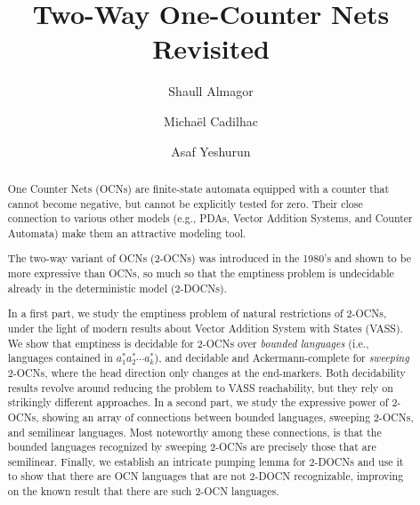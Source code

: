 \documentclass[USenglish]{lipics-v2021}
\title{Two-Way One-Counter Nets Revisited}
\author{Shaull Almagor}{Department of Computer Science, Technion, Israel \and \url{https://shaull.cswp.cs.technion.ac.il/}} {shaull@technion.ac.il}{https://orcid.org/0000-0001-9021-1175}{supported by the ISRAEL SCIENCE FOUNDATION (grant No. 989/22)}
\author{Michaël Cadilhac}{DePaul University, USA}{michael@cadilhac.name}{0000-0001-9828-9129}{}
\author{Asaf Yeshurun}{Department of Computer Science, Technion, Israel} {asafyeshurun@campus.technion.ac.il}{}{}
\begin{document}
	
	\maketitle
	
	\begin{abstract}
		One Counter Nets (OCNs) are finite-state automata equipped with a counter that
		cannot become negative, but cannot be explicitly tested for zero. Their close
		connection to various other models (e.g., PDAs, Vector Addition Systems, and
		Counter Automata) make them an attractive modeling tool.
		
		The two-way variant of OCNs (2-OCNs) was introduced in the 1980's and shown to
		be more expressive than OCNs, so much so that the emptiness problem is
		undecidable already in the deterministic model (2-DOCNs).
		
		In a first part, we study the emptiness problem of natural restrictions of
		2-OCNs, under the light of modern results about Vector Addition System with
		States (VASS).  We show that emptiness is decidable for 2-OCNs over
		\emph{bounded languages} (i.e., languages contained in
		$a_1^*a_2^*\cdots a_k^*$), and decidable and Ackermann-complete for \emph{sweeping}
		2-OCNs, where the head direction only changes at the end-markers. Both
		decidability results revolve around reducing the problem to VASS reachability,
		but they rely on strikingly different approaches.  In a second part, we study
		the expressive power of 2-OCNs, showing an array of connections between
		bounded languages, sweeping 2-OCNs, and semilinear languages.  Most noteworthy
		among these connections, is that the bounded languages recognized by sweeping
		2-OCNs are precisely those that are semilinear. Finally, we establish an
		intricate pumping lemma for 2-DOCNs and use it to show that there are OCN
		languages that are not 2-DOCN recognizable, improving on the known result that
		there are such 2-OCN languages.
		
	\end{abstract}
\end{document}
